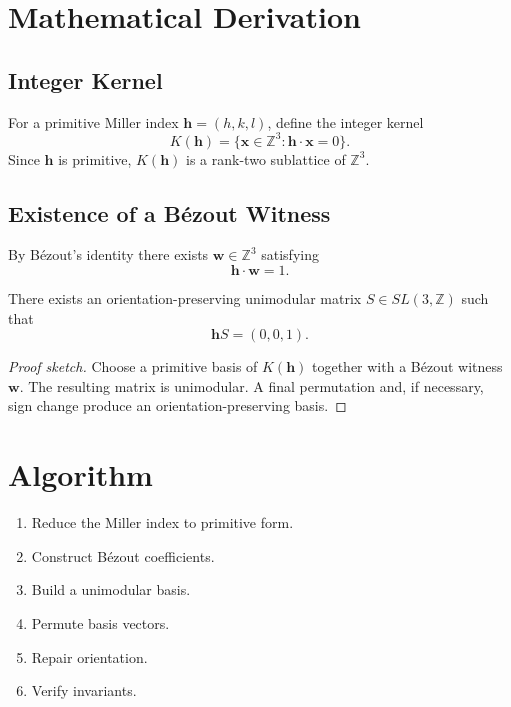 
\section{Mathematical Derivation}

\subsection{Integer Kernel}

For a primitive Miller index $\mathbf h=(h,k,l)$, define the integer kernel
\[
K(\mathbf h)=\{\mathbf x\in\mathbb Z^3:\mathbf h\cdot\mathbf x=0\}.
\]
Since $\mathbf h$ is primitive, $K(\mathbf h)$ is a rank-two sublattice of
$\mathbb Z^3$.

\subsection{Existence of a Bézout Witness}

By Bézout's identity there exists $\mathbf w\in\mathbb Z^3$ satisfying
\[
\mathbf h\cdot\mathbf w=1.
\]

\begin{theorem}
There exists an orientation-preserving unimodular matrix
$S\in SL(3,\mathbb Z)$ such that
\[
\mathbf hS=(0,0,1).
\]
\end{theorem}

\begin{proof}[Proof sketch]
Choose a primitive basis of $K(\mathbf h)$ together with a Bézout witness
$\mathbf w$. The resulting matrix is unimodular. A final permutation and,
if necessary, sign change produce an orientation-preserving basis.
\end{proof}

\section{Algorithm}

\begin{enumerate}
\item Reduce the Miller index to primitive form.
\item Construct Bézout coefficients.
\item Build a unimodular basis.
\item Permute basis vectors.
\item Repair orientation.
\item Verify invariants.
\end{enumerate}

